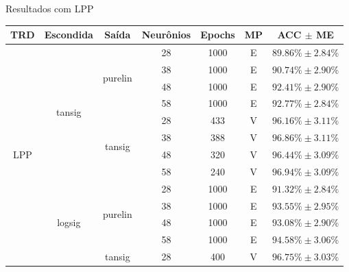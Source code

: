 \begin{frame}{Resultados com LPP}
	\footnotesize
	\begin{tabularx}{\linewidth}{| c | c | c | c | c | c | c |}
                \toprule
                TRD & Escondida & Saída & Neurônios & Epochs & MP & ACC $\pm$ ME\\
                \midrule
                \endhead
                \multirow{16}{*}{LPP} & \multirow{8}{*}{tansig} & \multirow{4}{*}{purelin} & 28 & 1000 & E & $ 89.86\% \pm 2.84\%$\\
                                      &                         &                          & 38 & 1000 & E & $ 90.74\% \pm 2.90\%$\\
                                      &                         &                          & 48 & 1000 & E & $ 92.41\% \pm 2.90\%$\\
                                      &                         &                          & 58 & 1000 & E & $ 92.77\% \pm 2.84\%$\\\cline{3-7}
                                      &                         & \multirow{4}{*}{tansig}  & 28 & 433 & V & $ 96.16\% \pm 3.11\% $\\*
                                      &                         &                          & 38 & 388 & V & $ 96.86\% \pm 3.11\% $\\*
                                      &                         &                          & 48 & 320 & V & $ 96.44\% \pm 3.09\% $\\*
                                      &                         &                          & 58 & 240 & V & $ 96.94\% \pm 3.09\% $\\\cline{2-7}
                                      & \multirow{8}{*}{logsig} & \multirow{4}{*}{purelin} & 28 & 1000 & E & $ 91.32\% \pm 2.84\%$\\
                                      &                         &                          & 38 & 1000 & E & $ 93.55\% \pm 2.95\%$\\
                                      &                         &                          & 48 & 1000 & E & $ 93.08\% \pm 2.90\%$\\
                                      &                         &                          & 58 & 1000 & E & $ 94.58\% \pm 3.06\%$\\\cline{3-7}
                                      &                         & \multirow{4}{*}{tansig}  & 28 & 400 & V & $ 96.75\% \pm 3.03\%$\\

\end{tabularx}
\end{frame}
